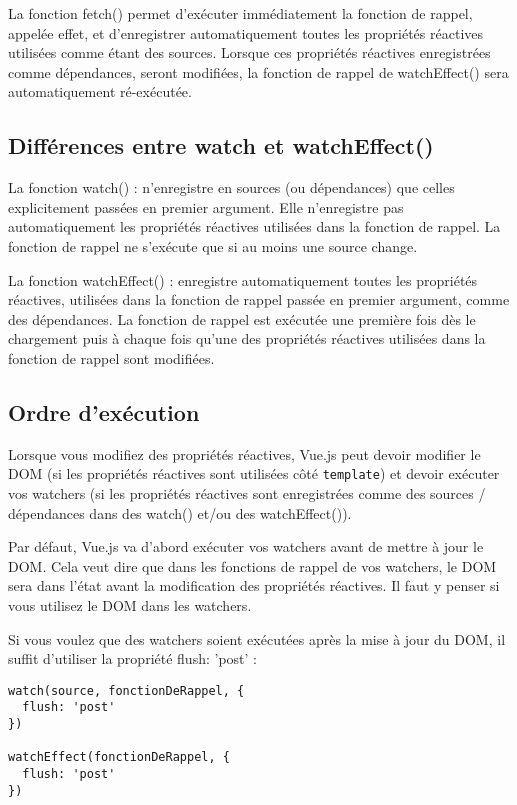 La fonction {\color{monOrange}fetch()} permet d'exécuter immédiatement la fonction de rappel, appelée effet, et d'enregistrer automatiquement toutes les propriétés réactives utilisées comme étant des sources. Lorsque ces propriétés réactives enregistrées comme dépendances, seront modifiées, la fonction de rappel de {\color{monOrange}watchEffect()} sera automatiquement ré-exécutée.

\subsection{Différences entre {\color{monOrange}watch} et {\color{monOrange}watchEffect()}}
La fonction {\color{monOrange}watch()} : n'enregistre en sources (ou dépendances) que celles explicitement passées en premier argument. Elle n'enregistre pas automatiquement les propriétés réactives utilisées dans la fonction de rappel. La fonction de rappel ne s'exécute que si au moins une source change.

La fonction {\color{monOrange}watchEffect()} : enregistre automatiquement toutes les propriétés réactives, utilisées dans la fonction de rappel passée en premier argument, comme des dépendances. La fonction de rappel est exécutée une première fois dès le chargement puis à chaque fois qu'une des propriétés réactives utilisées dans la fonction de rappel sont modifiées.

\subsection{Ordre d'exécution}
Lorsque vous modifiez des propriétés réactives, {\color{monOrange}Vue.js} peut devoir modifier le DOM (si les propriétés réactives sont utilisées côté {\tt template}) et devoir exécuter vos {\color{monOrange}watchers} (si les propriétés réactives sont enregistrées comme des sources / dépendances dans des {\color{monOrange}watch()} et/ou des {\color{monOrange}watchEffect()}).

Par défaut, {\color{monOrange}Vue.js} va d'abord exécuter vos {\color{monOrange}watchers} avant de mettre à jour le DOM. Cela veut dire que dans les fonctions de rappel de vos {\color{monOrange}watchers}, le DOM sera dans l'état avant la modification des propriétés réactives. Il faut y penser si vous utilisez le DOM dans les {\color{monOrange}watchers}.

Si vous voulez que des {\color{monOrange}watchers} soient exécutées après la mise à jour du DOM, il suffit d'utiliser la propriété flush: {\color{monOrange}'post'} :
\begin{verbatim}
watch(source, fonctionDeRappel, {
  flush: 'post'
})

watchEffect(fonctionDeRappel, {
  flush: 'post'
})
\end{verbatim}


